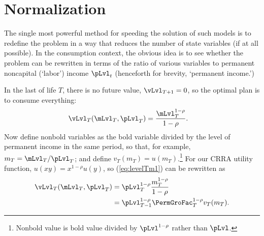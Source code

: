 \hypertarget{normalization}{}
\section{Normalization}\label{sec:normalization}

The single most powerful method for speeding the solution of such models is to redefine the problem in a way that reduces the number of state variables (if at all possible).  In the consumption context, the obvious idea is to see whether the problem can be rewritten in terms of the ratio of various variables to permanent noncapital (`labor') income $\pLvl_{t}$ (henceforth for brevity, `permanent income.')

In the last {\interval} of life $T$, there is no future value, $\vLvl_{T+1} = 0$, so the optimal plan is to consume everything:
\begin{equation}\begin{gathered}\begin{aligned}
      \vLvl_{T}(\mLvl_{T},\pLvl_{T})  & = \frac{\mLvl_{T}^{1-\rho}}{1-\rho}. \label{eq:levelTm1}
    \end{aligned}\end{gathered}\end{equation}
Now define nonbold variables as the bold variable divided by the level of permanent income in the same period, so that, for example, $m_{T}=\mLvl_{T}/\pLvl_{T}$; and define $v_{T}(m_{T}) = u(m_{T})$.\footnote{Nonbold value is bold value divided by $\pLvl^{1-\rho}$ rather than $\pLvl$.}  For our CRRA utility function, $u(xy)=x^{1-\rho}u(y)$, so (\ref{eq:levelTm1}) can be rewritten as
\begin{equation}\begin{gathered}\begin{aligned}
      \vLvl_{T}(\mLvl_{T},\pLvl_{T}) & = \pLvl_{T}^{1-\rho}\frac{{m}_{T}^{1-\rho}}{1-\rho}                       \\
                                                &= \pLvl_{T-1}^{1-\rho}\PermGroFac_{T}^{1-\rho}v_{T}(m_{T}). \label{eq:vT}
    \end{aligned}\end{gathered}\end{equation}

